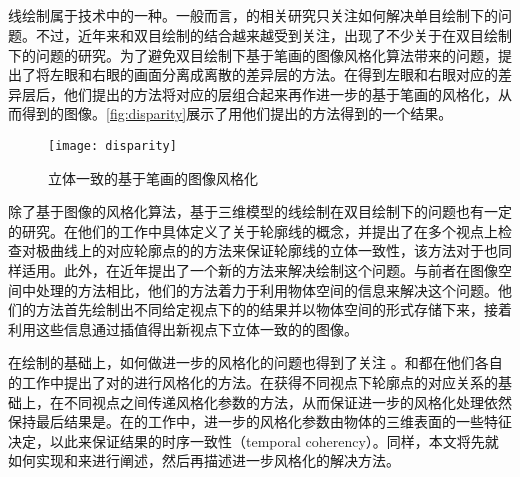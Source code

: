 \subsection{\stc{}\npr{}}

线绘制属于\npr{}技术中的一种。一般而言，\npr{}的相关研究只关注如何解决单目绘制下的问题。不过，近年来\npr{}和双目绘制的结合越来越受到关注，出现了不少关于\npr{}在双目绘制下的问题的研究。为了避免双目绘制下基于笔画的图像风格化算法\cite{hertzmann1998painterly}带来的问题，\citeauthor{northam2012consistent}\cite{northam2012consistent,northam2013stereoscopic}提出了将左眼和右眼的画面分离成离散的差异层的方法。在得到左眼和右眼对应的差异层后，他们提出的方法将对应的层组合起来再作进一步的基于笔画的风格化，从而得到\stc{}的图像。\autoref{fig:disparity}展示了用他们提出的方法得到的一个结果。

\begin{figure}[tbh]
    \centering
    \texttt{[image: disparity]}
    \caption{\label{fig:disparity}
    立体一致的基于笔画的图像风格化}
\end{figure}

除了基于图像的风格化算法，基于三维模型的线绘制在双目绘制下的问题也有一定的研究。\citeauthor{kim2013stereoscopic}在他们的工作中具体定义了关于轮廓线的\stc{}概念，并提出了在多个视点上检查对极曲线上的对应轮廓点的的方法来保证轮廓线的立体一致性，该方法对于\scon{}也同样适用。此外，\citeauthor{bukenberger2018stereo}在近年提出了一个新的方法\cite{bukenberger2018stereo}来解决\stc{}\vdl{}绘制这个问题。与前者在图像空间中处理的方法相比，他们的方法着力于利用物体空间的信息来解决这个问题。他们的方法首先绘制出不同给定视点下的\vdl{}的结果并以物体空间的形式存储下来，接着利用这些信息通过插值得出新视点下立体一致的\vdl{}的图像。

在\stc{}\vdl{}绘制的基础上，如何做进一步的风格化的问题也得到了关注\cite{northrup2000artistic,kalnins2003coherent} 。\citeauthor{kim2013stereoscopic}和\citeauthor{bukenberger2018stereo}都在他们各自的工作中提出了对\stc{}的\vdl{}进行风格化的方法。在获得不同视点下轮廓点的对应关系的基础上，\citeauthor{kim2013stereoscopic}在不同视点之间传递风格化参数的方法，从而保证进一步的风格化处理依然保持最后结果是\stc{}。在\citeauthor{bukenberger2018stereo}的工作中，进一步的风格化参数由物体的三维表面的一些特征决定，以此来保证结果的时序一致性（temporal coherency）。同样，本文将先就如何实现\stc{}\con{}和\scon{}来进行阐述，然后再描述进一步风格化的解决方法。

\subsection{\ppll{}}

